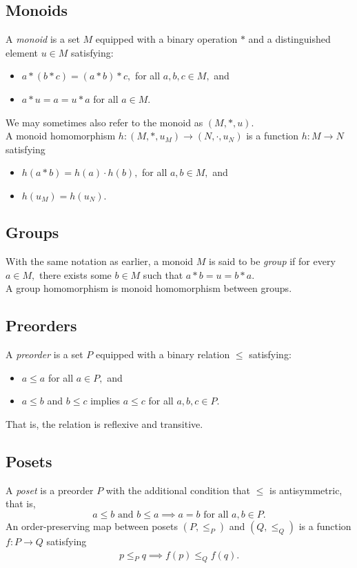 \subsection{Monoids}
A \emph{monoid} is a set $M$ equipped with a binary operation $*$ and a distinguished element $u \in M$ satisfying:
\begin{itemize}
	\item $a*(b*c) = (a*b)*c,$ for all $a, b, c \in M,$ and
	\item $a*u = a = u*a$ for all $a \in M.$
\end{itemize}
We may sometimes also refer to the monoid as $(M, *, u).$\\
A monoid homomorphism $h:(M, *, u_M) \to (N, \cdot, u_N)$ is a function $h:M\to N$ satisfying
\begin{itemize}
	\item $h(a*b) = h(a)\cdot h(b),$ for all $a, b \in M,$ and
	\item $h(u_M) = h(u_N).$
\end{itemize}
\subsection{Groups}
With the same notation as earlier, a monoid $M$ is said to be \emph{group} if for every $a \in M,$ there exists some $b \in M$ such that $a * b = u = b * a.$\\
A group homomorphism is monoid homomorphism between groups.
\subsection{Preorders}
A \emph{preorder} is a set $P$ equipped with a binary relation $\le$ satisfying:
\begin{itemize}
	\item $a \le a$ for all $a \in P,$ and
	\item $a \le b$ and $b \le c$ implies $a \le c$ for all $a, b, c \in P.$
\end{itemize}
That is, the relation is reflexive and transitive.
\subsection{Posets}
A \emph{poset} is a preorder $P$ with the additional condition that $\le$ is antisymmetric, that is,
	\begin{equation*} 
		a \le b \text{ and } b \le a \implies a = b \text{ for all } a, b \in P.
	\end{equation*}
An order-preserving map between posets $(P, \le_P)$ and $(Q, \le_Q)$ is a function $f:P\to Q$ satisfying
\begin{align*} 
	p \le_P q \implies f(p) \le_Q f(q). 
\end{align*}
